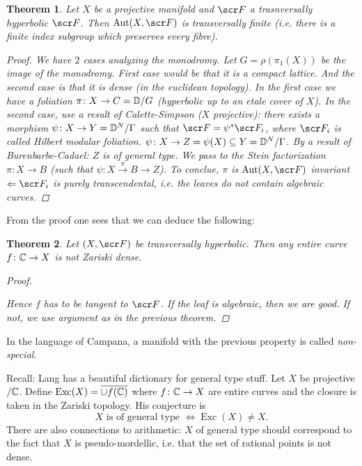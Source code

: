 \documentclass[A4paper, british, reqno]{amsart}
\theoremstyle{darkgreentheorem}
\newtheorem{thm}{Theorem}[section]
\theoremstyle{darkbluedefinition}
\theoremstyle{darkredexample}
\theoremstyle{remark}
\DeclareMathOperator{\Aut}{Aut}
\DeclareMathOperator{\Exc}{Exc}
\newcommand{\1}{\mathbbm{1}}
\newcommand{\sub}{\subseteq}
\begin{document}
\begin{thm}
    Let $X$ be a projective manifold and $\F$ a trasnversally hyperbolic $\F$.
    Then $\Aut(X,\F)$ is transversally finite (i.e. there is a finite index subgroup which preserves every fibre).
    \begin{proof}
	We have $2$ cases analyzing the monodromy.
	Let $G=\rho(\pi_{1}(X))$ be the image of the monodromy.
	First case would be that it is a compact lattice.
	And the second case is that it is dense (in the euclidean topology).
	In the first case we have a foliation $\pi\colon X\to C=\mathbb{D}/G$ (hyperbolic up to an etale cover of $X$).
	In the second case, use a result of Calette-Simpson ($X$ projective): there exists a morphism $\psi\colon X\to Y=\mathbb{D}^{N}/\Gamma$ such that $\F=\psi^{*}\F_{i}$, where $\F_{i}$ is called Hilbert modular foliation.
	$\psi \colon X\to Z=\psi(X)\sub Y=\bbD^{N}/\Gamma$.
	By a result of Burenbarbe-Cadael: $Z$ is of general type.
	We pass to the Stein factorization $\pi \colon X\to B$ (such that $\psi\colon X\xrightarrow{\pi}B\to Z$).
	To conclue, $\pi$ is $\Aut(X,\F)$ invariant $\Leftarrow \F_{i}$ is purely transcendental, i.e. the leaves do not contain algebraic curves.
    \end{proof}
\end{thm}

From the proof one sees that we can deduce the following:

\begin{thm}
    Let $(X,\F)$ be transversally hyperbolic.
    Then any entire curve $f\colon \mathbb{C}\to X$ is not Zariski dense.
    \begin{proof}
	\begin{center}
	\end{center}
	Hence $f$ has to be tangent to $\F$.
	If the leaf is algebraic, then we are good.
	If not, we use argument as in the previous theorem.
    \end{proof}
\end{thm}

In the language of Campana, a manifold with the previous property is called \textit{non-special}.

Recall: Lang has a beautiful dictionary for general type stuff.
Let $X$ be projective $/\mathbb{C}$.
Define $\Exc(X)=\overline{\cup f(\C)}$ where $f\colon \mathbb{C}\to X$ are entire curves and the closure is taken in the Zariski topology.
His conjecture is
\[ X \text{ is of general type } \Leftrightarrow \Exc(X)\neq X.\]
There are also connections to arithmetic: $X$ of general type should correspond to the fact that $X$ is pseudo-mordellic, i.e. that the set of rational points is not dense.
\end{document}
